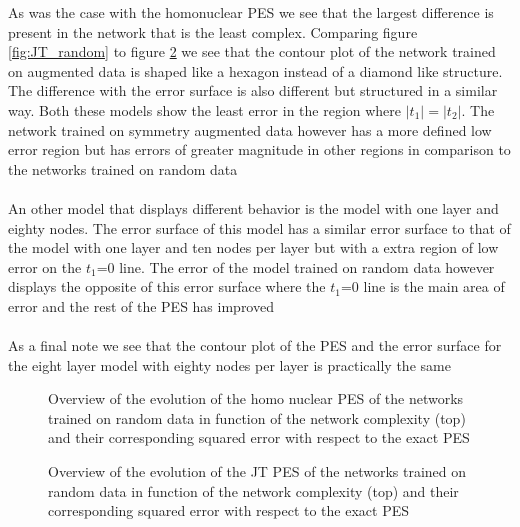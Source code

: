 \documentclass[12pt]{article}
\begin{document}
As was the case with the homonuclear PES we see that the largest difference is present in the network that is the least complex. Comparing figure \ref{fig:JT_random} to figure \ref{fig:JTaug} we see that the contour plot of the network trained on augmented data is shaped like a hexagon instead of a diamond like structure. The difference with the error surface is also different but structured in a similar way. Both these models show the least error in the region where $\lvert t_1 \rvert = \lvert t_2 \rvert$. The network trained on symmetry augmented data however has a more defined low error region but has errors of greater magnitude in other regions in comparison to the networks trained on random data
\\
\\
An other model that displays different behavior is the model with one layer and eighty nodes. The error surface of this model has a similar error surface to that of the model with one layer and ten nodes per layer but with a extra region of low error on the $t_1$=0 line. The error of the model trained on random data however displays the opposite of this error surface where the $t_1$=0 line is the main area of error and the rest of the PES has improved 
\\
\\
As a final note we see that the contour plot of the PES and the error surface for the eight layer model with eighty nodes per layer is practically the same
\begin{figure}[H]
	\centering
	\begin{subfigure}
		\texttt{[image: "Linear\_PES\_nfac"]}
	\end{subfigure}
	\begin{subfigure}
		\texttt{[image: "Linear\_PES\_MSE\_nfac"]}
	\end{subfigure}
	\caption{Overview of the evolution of the homo nuclear PES of the networks trained on random data in function of the network complexity (top) and their corresponding squared error with respect to the exact PES}
	\label{fig:PESaug}
\end{figure}
\begin{figure}
	\centering
	\begin{subfigure}
		\texttt{[image: "Linear\_JT\_nfac"]}
	\end{subfigure}
	\begin{subfigure}
		\texttt{[image: "Linear\_JT\_MSE\_nfac"]}
	\end{subfigure}
	\caption{Overview of the evolution of the JT PES of the networks trained on random data in function of the network complexity (top) and their corresponding squared error with respect to the exact PES}
	\label{fig:JTaug}	
\end{figure}
\newpage
\end{document}
